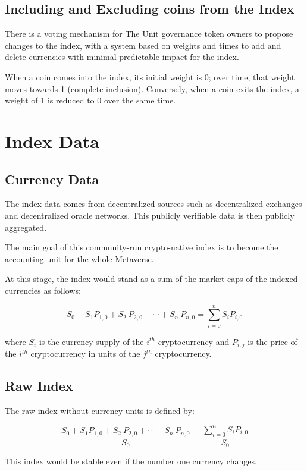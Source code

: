 \documentclass[12pt]{article}
\begin{document}
\subsection{Including and Excluding coins from the Index}

There is a voting mechanism for The Unit governance token owners to propose changes to the index, with a system based on weights and times to add and delete currencies with minimal predictable impact for the index.

When a coin comes into the index, its initial weight is 0; over time, that weight moves towards 1 (complete inclusion). Conversely, when a coin exits the index, a weight of 1 is reduced to 0 over the same time.


\section{Index Data}

\subsection{Currency Data}

The index data comes from decentralized sources such as decentralized exchanges and decentralized oracle networks. This publicly verifiable data is then publicly aggregated.

The main goal of this community-run crypto-native index is to become the accounting unit for the whole Metaverse. 

At this stage, the index would stand as a sum of the market caps of the indexed currencies as follows: 

$$
S_0+S_1 P_{1,0}+ S_2\ P_{2,0}+\cdots+ S_n\ P_{n,0} = \sum_{i=0}^{n} S_iP_{i,0}
$$

where $S_i$ is the currency supply of the $i^{th}$ cryptocurrency and $P_{i,j}$ is the price of the $i^{th}$ cryptocurrency in units of the $j^{th}$ cryptocurrency.

\subsection{Raw Index}

The raw index without currency units is defined by:

$$
\frac{S_0+S_1 P_{1,0}+ S_2\ P_{2,0}+\cdots+ S_n\ P_{n,0}}{S_0}= \frac{\sum_{i=0}^{n} S_iP_{i,0}}{S_0}
$$

This index would be stable even if the number one currency changes.
\end{document}
